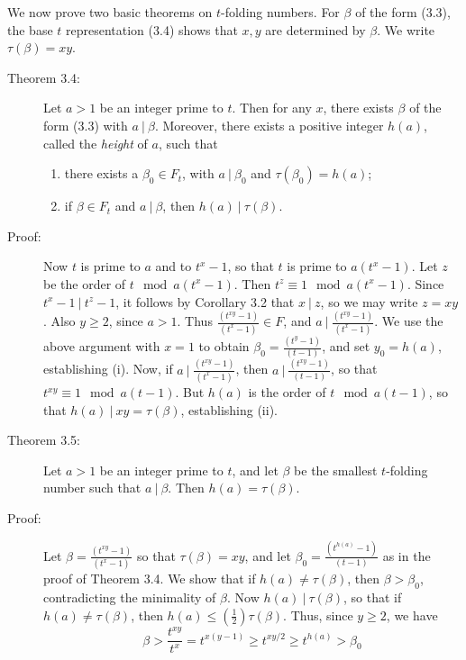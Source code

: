 We now prove two basic theorems on $t$-folding numbers. For $\beta$ of the form (3.3), the base $t$ representation (3.4) shows that $x,y$ are determined by $\beta$. We write $\tau(\beta) = xy$.

\begin{description}

  \item[Theorem 3.4:] Let $a > 1$ be an integer prime to $t$. Then for any $x$, there exists $\beta$ of the form (3.3) with $a\ |\ \beta$. Moreover, there exists a positive integer $h(a)$, called the \emph{height} of $a$, such that
    \begin{enumerate}[\hspace{1cm}(i)]
      \item there exists a $\beta_{0} \in F_{t}$, with $a\ |\ \beta_{0}$ and $\tau(\beta_{0}) = h(a)$;
      \item if $\beta \in F_{t}$ and $a\ |\ \beta$, then $h(a)\ |\ \tau(\beta)$.
    \end{enumerate}

  \item[Proof:] Now $t$ is prime to $a$ and to $t^{x}-1$, so that $t$ is prime to $a(t^{x}-1)$. Let $z$ be the order of $t \mod{a(t^{x}-1)}$. Then $t^{z} \equiv 1 \mod{a(t^{x}-1)}$. Since $t^{x}-1\ |\ t^{z}-1$, it follows by Corollary 3.2 that $x\ |\ z$, so we may write $z = xy$. Also $y \geq 2$, since $a > 1$. Thus $\frac{(t^{xy}-1)}{(t^{x}-1)} \in F$, and $a\ |\ \frac{(t^{xy}-1)}{(t^{x}-1)}$. We use the above argument with $x = 1$ to obtain $\beta_{0} = \frac{(t^{y}-1)}{(t-1)}$, and set $y_{0} = h(a)$, establishing (i). Now, if $a\ |\ \frac{(t^{xy}-1)}{(t^{x}-1)}$, then $a\ |\ \frac{(t^{xy}-1)}{(t-1)}$, so that $t^{xy} \equiv 1 \mod{a(t-1)}$. But $h(a)$ is the order of $t \mod{a(t-1)}$, so that $h(a)\ |\ xy = \tau(\beta)$, establishing (ii).

  \item[Theorem 3.5:] Let $a > 1$ be an integer prime to $t$, and let $\beta$ be the smallest $t$-folding number such that $a\ |\ \beta$. Then $h(a) = \tau(\beta)$.

  \item[Proof:] Let $\beta = \frac{(t^{xy}-1)}{(t^{x}-1)}$ so that $\tau(\beta) = xy$, and let $\beta_{0} = \frac{(t^{h(a)}-1)}{(t-1)}$ as in the proof of Theorem 3.4. We show that if $h(a) \neq \tau(\beta)$, then $\beta > \beta_{0}$, contradicting the minimality of $\beta$. Now $h(a)\ |\ \tau(\beta)$, so that if $h(a) \neq \tau(\beta)$, then $h(a) \leq \left( \frac{1}{2} \right) \tau(\beta)$. Thus, since $y \geq 2$, we have
    \begin{equation*}
    \beta > \frac{t^{xy}}{t^{x}} = t^{x(y-1)} \geq t^{xy/2} \geq t^{h(a)} > \beta_{0}
    \end{equation*}


\end{description}
